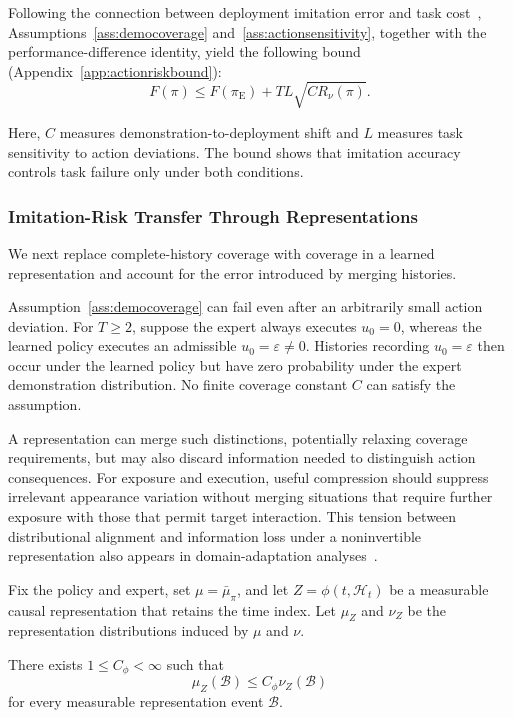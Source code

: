 Following the connection between deployment imitation error
and task cost~\cite{ross2011}, Assumptions~\ref{ass:democoverage}
and~\ref{ass:actionsensitivity}, together with the
performance-difference identity, yield the following bound (Appendix~\ref{app:actionriskbound}):
\begin{equation}
 F(\pi)\le F(\pi_{\mathrm E})+TL\sqrt{C R_\nu(\pi)}.
 \label{eq:successbound}
\end{equation}

Here, $C$ measures demonstration-to-deployment shift and $L$ measures task sensitivity to action deviations.
The bound shows that imitation accuracy controls task failure only under both conditions.

\subsubsection{Imitation-Risk Transfer Through Representations}
\label{sec:representationcoverage}
We next replace complete-history coverage with coverage in a learned representation and account for the error introduced by merging histories.

Assumption~\ref{ass:democoverage} can fail even after an arbitrarily small action deviation.
For $T\ge2$, suppose the expert always executes $u_0=0$, whereas the learned policy executes
an admissible $u_0=\varepsilon\ne0$.
Histories recording $u_0=\varepsilon$ then occur under the learned policy
but have zero probability under the expert demonstration distribution.
No finite coverage constant $C$ can satisfy the assumption.

A representation can merge such distinctions, potentially relaxing coverage requirements,
but may also discard information needed to distinguish action consequences.
For exposure and execution, useful compression should suppress irrelevant appearance variation without merging situations that require further exposure with those that permit target interaction.
This tension between distributional alignment and information loss under a noninvertible representation
also appears in domain-adaptation analyses~\cite{johansson2019support,zhao2019invariant}.

Fix the policy and expert, set $\mu=\bar\mu_\pi$, and let $Z=\phi(t,\mathcal H_t)$ be a measurable causal representation that retains the time index.
Let $\mu_Z$ and $\nu_Z$ be the representation distributions induced by $\mu$ and $\nu$.

\begin{assumption}
\label{ass:representationcoverage}
There exists $1\le C_\phi<\infty$ such that
\begin{equation}
 \mu_Z(\mathcal B)\le C_\phi\nu_Z(\mathcal B)
 \label{eq:representationcoverage}
\end{equation}
for every measurable representation event $\mathcal B$.
\end{assumption}

